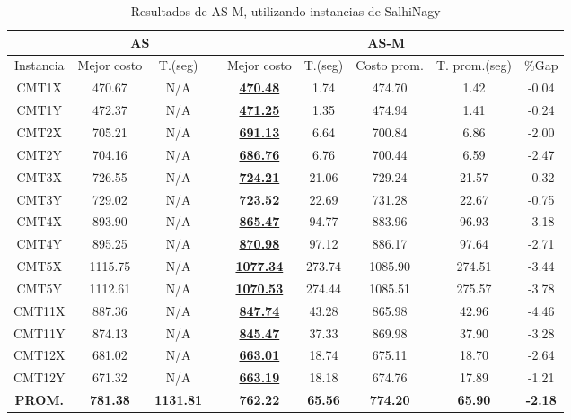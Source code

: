 \begin{table}[h]
\caption{ Resultados de AS-M, utilizando instancias de SalhiNagy}
\centering
\scriptsize
\begin{tabular*}{1.00\textwidth}{@{\extracolsep{\fill}} |c||c c||c c c c c c|}
\hline
 & \multicolumn{2}{c||}{\bf{AS}} & \multicolumn{6}{c|}{\bf{AS-M}}\\\hline
Instancia & Mejor costo & T.(seg) & & Mejor costo & T.(seg) & Costo prom. & T. prom.(seg) & \%Gap\\ [0.5ex]
\hline\hline
CMT1X & 470.67 & N/A & & \bf{\underline{470.48}} & 
1.74 & 474.70 & 1.42 & -0.04\\CMT1Y & 472.37 & N/A & & \bf{\underline{471.25}} & 
1.35 & 474.94 & 1.41 & -0.24\\CMT2X & 705.21 & N/A & & \bf{\underline{691.13}} & 
6.64 & 700.84 & 6.86 & -2.00\\CMT2Y & 704.16 & N/A & & \bf{\underline{686.76}} & 
6.76 & 700.44 & 6.59 & -2.47\\CMT3X & 726.55 & N/A & & \bf{\underline{724.21}} & 
21.06 & 729.24 & 21.57 & -0.32\\CMT3Y & 729.02 & N/A & & \bf{\underline{723.52}} & 
22.69 & 731.28 & 22.67 & -0.75\\CMT4X & 893.90 & N/A & & \bf{\underline{865.47}} & 
94.77 & 883.96 & 96.93 & -3.18\\CMT4Y & 895.25 & N/A & & \bf{\underline{870.98}} & 
97.12 & 886.17 & 97.64 & -2.71\\CMT5X & 1115.75 & N/A & & \bf{\underline{1077.34}} & 
273.74 & 1085.90 & 274.51 & -3.44\\CMT5Y & 1112.61 & N/A & & \bf{\underline{1070.53}} & 
274.44 & 1085.51 & 275.57 & -3.78\\CMT11X & 887.36 & N/A & & \bf{\underline{847.74}} & 
43.28 & 865.98 & 42.96 & -4.46\\CMT11Y & 874.13 & N/A & & \bf{\underline{845.47}} & 
37.33 & 869.98 & 37.90 & -3.28\\CMT12X & 681.02 & N/A & & \bf{\underline{663.01}} & 
18.74 & 675.11 & 18.70 & -2.64\\CMT12Y & 671.32 & N/A & & \bf{\underline{663.19}} & 
18.18 & 674.76 & 17.89 & -1.21\\\hline\hline\bf{PROM.} & 
\bf{781.38} & \bf{1131.81} & & \bf{762.22} & \bf{65.56} & \bf{774.20} & \bf{65.90} & \bf{-2.18}\\[1ex]\hline
\end{tabular*}
\label{apendice-table:aco-finalS}
\end{table}

